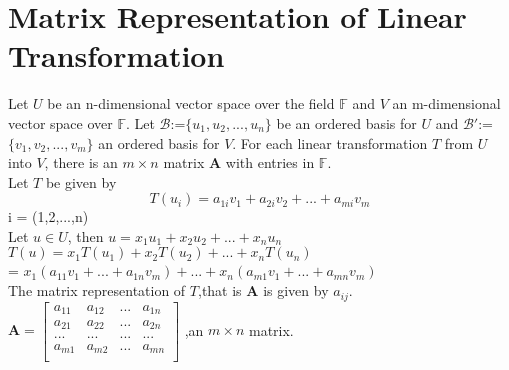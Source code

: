 \documentclass[12pt]{article}
\theoremstyle{definition}
\begin{document}
	\section{Matrix Representation of Linear Transformation}
	 Let $U$ be an n-dimensional vector space over the field $ \mathbb{F}$ and $V$ an m-dimensional vector space over $\mathbb{F}$. Let $\mathcal{B}$:=$\{u_1,u_2,...,u_n\}$ be an ordered basis for $U$ and $\mathcal{B\prime}$:=$\{v_1,v_2,...,v_m\}$ an ordered basis for $V$. For each linear transformation $T$ from $U$ into $V$, there is an $ m\times n$ matrix $\mathbf{A}$ with entries in $\mathbb{F}$.\\
	 Let $T$ be given by
 	 $$ T(u_{i})=a_{1i}v_1+a_{2i}v_2+...+a_{mi}v_m $$
	  i = (1,2,...,n)\\
	  Let $u\in U$, then $u = x_1u_1+x_2u_2+...+x_nu_n$\\
	  $T(u) = x_1T(u_1)+x_2T(u_2)+...+x_nT(u_n)$\\
	  \hspace*{1cm}= $x_1(a_{11}v_1+...+a_{1n}v_m	)+...+x_n(a_{m1}v_1+...+a_{mn}v_m	)$\\
	  The matrix representation of $T$,that is $\mathbf{A}$ is given by $a_{ij}.$\\
	  $
	  \mathbf{A} =
	  \begin{bmatrix}
	  a_{11} & a_{12} & ... &a_{1n}\\
	  a_{21} & a_{22} & ... &a_{2n}\\
	  ...&...&...&...\\
	  a_{m1} & a_{m2} & ... &a_{mn}\\
	  \end{bmatrix}
	  $
	  ,an $m\times n$ matrix.
	  \\
	  \\
	  \\
\end{document}
